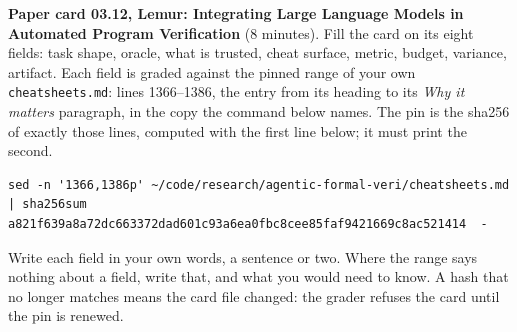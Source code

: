 \documentclass[11pt]{article}
\begin{document}
\begin{problem}\label{prob:B4}
\textbf{Paper card 03.12, Lemur: Integrating Large Language Models in
Automated Program Verification} (8 minutes). Fill the card on its eight
fields: task shape, oracle, what is trusted, cheat surface, metric, budget,
variance, artifact. Each field is graded against the pinned range of your own
\texttt{cheatsheets.md}: lines 1366--1386, the entry from its heading to its
\emph{Why it matters} paragraph, in the copy the command below names. The pin
is the sha256 of exactly those lines, computed with the first line below; it
must print the second.
{\small
\begin{verbatim}
sed -n '1366,1386p' ~/code/research/agentic-formal-veri/cheatsheets.md | sha256sum
a821f639a8a72dc663372dad601c93a6ea0fbc8cee85faf9421669c8ac521414  -
\end{verbatim}
}
Write each field in your own words, a sentence or two. Where the range says
nothing about a field, write that, and what you would need to know. A hash
that no longer matches means the card file changed: the grader refuses the
card until the pin is renewed.
\end{problem}
\end{document}
